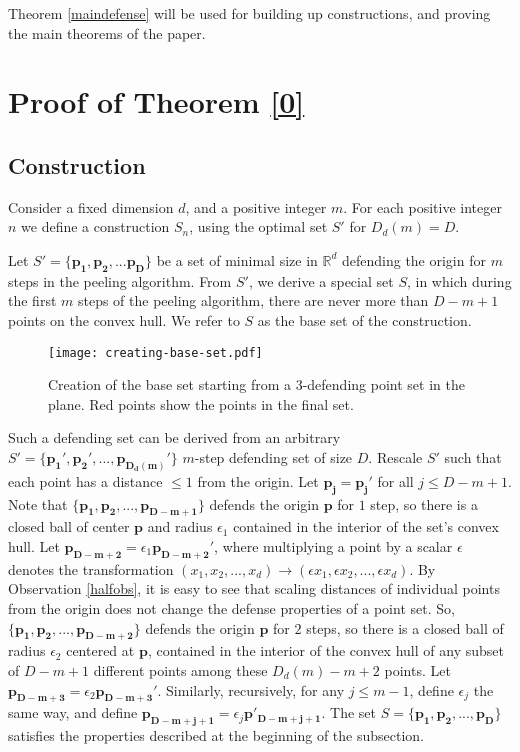 \documentclass[a4paper,UKenglish,cleveref, autoref, thm-restate]{lipics-v2021}
\def\R{\mathbb{R}}
\def\p{\mathbf{p}}
\begin{document}
    Theorem \ref{maindefense} will be used for building up constructions, and proving the main theorems of the paper.

    \section{Proof of Theorem \ref{0}}

    \subsection{Construction}
        Consider a fixed dimension $d$, and a positive integer $m$. For each positive integer $n$ we define a construction $S_n$, using the optimal set $S'$ for $D_d(m)=D$.


        Let $S'=\{\mathbf{p_1,p_2,...p_{D}}\}$ be a set of minimal size in $\R^d$ defending the origin for $m$ steps in the peeling algorithm. From $S'$, we derive a special set $S$, in which during the first $m$ steps of the peeling algorithm, there are never more than $D-m+1$ points on the convex hull. We refer to $S$ as the base set of the construction.

  \begin{figure}
	\begin{center}
		\texttt{[image: creating-base-set.pdf]}
		\caption{Creation of the base set starting from a $3$-defending point set in the plane. Red points show the points in the final set.}
		\label{fig:base}
	\end{center}
\end{figure}       

  Such a defending set can be derived from an arbitrary $S'=\{\mathbf{p_1', p_2',..., p_{D_d(m)}'}\}$ $m$-step defending set of size $D$. Rescale $S'$ such that each point has a distance $\leq1$ from the origin. Let $\mathbf{p_j}=\mathbf{p_j'}$ for all $j\leq D-m+1$. Note that $\{\mathbf{p_1,p_2,..., p_{D-m+1}}\}$ defends the origin $\p$ for $1$ step, so there is a closed ball of center $\p$ and radius $\epsilon_1$ contained in the interior of the set's convex hull. Let $\mathbf{p_{D-m+2}}=\epsilon_1\mathbf{p_{D-m+2}'}$, where multiplying a point by a scalar $\epsilon$ denotes the transformation $(x_1, x_2,..., x_d)\rightarrow(\epsilon x_1, \epsilon x_2,..., \epsilon x_d)$.
 By Observation \ref{halfobs}, it is easy to see that scaling distances of individual points from the origin does not change the defense properties of a point set.
 So, $\{\mathbf{p_1,p_2,..., p_{D-m+2}}\}$ defends the origin $\p$ for $2$ steps, so there is a closed ball of radius $\epsilon_2$ centered at $\p$, contained in the interior of the convex hull of any subset of $D-m+1$ different points among these $D_d(m)-m+2$ points. Let $\mathbf{p_{D-m+3}}=\epsilon_2 \mathbf{p_{D-m+3}'}$. Similarly, recursively, for any $j\leq m-1$, define $\epsilon_j$ the same way, and define $\mathbf{p_{D-m+j+1}}=\epsilon_j\mathbf{p'_{D-m+j+1}}$. The set $S=\{\mathbf{p_1, p_2,..., p_{D}}\}$ satisfies the properties described at the beginning of the subsection.
\end{document}
